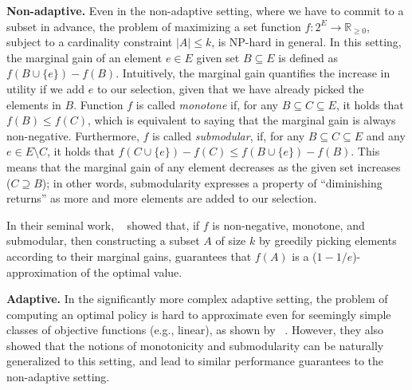 \documentclass{article}
\newcommand{\citet}[1]{\citeauthor{#1}~\shortcite{#1}}
\renewcommand{\paragraph}[1]{\vspace{0.3em}\noindent\textbf{#1.}\makebox[0.5em]{}}
\begin{document}
\paragraph{Non-adaptive}
Even in the non-adaptive setting, where we have to commit to a subset in advance, the problem of maximizing a set function $f : 2^E \to \mathbb{R}_{\geq 0}$, subject to a cardinality constraint $|A| \leq k$, is NP-hard in general.
In this setting, the marginal gain of an element $e \in E$ given set $B \subseteq E$ is defined as $f(B \cup \{e\}) - f(B)$.
Intuitively, the marginal gain quantifies the increase in utility if we add $e$ to our selection, given that we have already picked the elements in $B$.
Function $f$ is called \emph{monotone} if, for any $B \subseteq C \subseteq E$, it holds that $f(B) \leq f(C)$, which is equivalent to saying that the marginal gain is always non-negative.
Furthermore, $f$ is called \emph{submodular}, if, for any $B \subseteq C \subseteq E$ and any $e \in E \setminus C$, it holds that $f(C \cup \{e\}) - f(C) \leq  f(B \cup \{e\}) - f(B)$.
This means that the marginal gain of any element decreases as the given set increases ($C \supseteq B$); in other words, submodularity expresses a property of ``diminishing returns'' as more and more elements are added to our selection.

In their seminal work, \citet{nemhauser78} showed that, if $f$ is non-negative, monotone, and submodular, then constructing a subset $A$ of size $k$ by greedily picking elements according to their marginal gains, guarantees that $f(A)$ is a ($1 - 1/e$)-approximation of the optimal value.

\paragraph{Adaptive}
In the significantly more complex adaptive setting, the problem of computing an optimal policy is hard to approximate even for seemingly simple classes of objective functions (e.g., linear), as shown by \citet{golovin11}.
However, they also showed that the notions of monotonicity and submodularity can be naturally generalized to this setting, and lead to similar performance guarantees to the non-adaptive setting.
\end{document}
